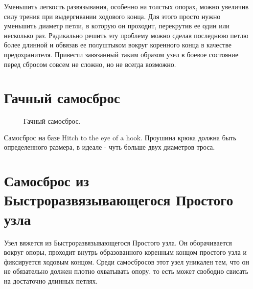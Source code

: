 \documentclass{artikel1}
\begin{document}
Уменьшить легкость развязывания, особенно на толстых опорах, можно увеличив силу трения при выдергивании ходового конца. Для этого просто нужно уменьшить диаметр петли, в которую он проходит, перекрутив ее один или несколько раз. Радикально решить эту проблему можно сделав последнюю петлю более длинной и обвязав ее полуштыком вокруг коренного конца в качестве предохранителя. Привести завязанный таким образом узел в боевое состояние перед сбросом совсем не сложно, но не всегда возможно.

\section{Гачный самосброс}

\begin{figure}[H]\centering
\setcounter{subfigure}{0}
	\begin{minipage}{1\linewidth}
		\begin{center}
			\tcbox[enhanced jigsaw,colframe=black,opacityframe=0.5,opacityback=0.5]
			{\centering{}}
		\end{center}
	\end{minipage}
\caption{Гачный самосброс.}
\label{ris:Gachny_samosbros}
\end{figure}

Самосброс на базе Hitch to the eye of a hook. Проушина крюка должна быть определенного размера, в идеале - чуть больше двух диаметров троса.

\section{Самосброс из Быстроразвязывающегося Простого узла}

Узел вяжется из Быстроразвязывающегося Простого узла. Он оборачивается вокруг опоры, проходит внутрь образованного коренным концом простого узла и фиксируется ходовым концом. Среди самосбросов этот узел уникален тем, что он не обязательно должен плотно охватывать опору, то есть может свободно свисать на достаточно длинных петлях.

\begin{figure}[H]\centering
	\subfloat[Завязывание]{\label{ris:Arbor_samosbros_1_1}
	\tcbox[enhanced jigsaw,colframe=black,opacityframe=0.5,opacityback=0.5,height=6.5cm]
		{\centering
			}
		}
\hfill
	\subfloat[Результат]{\label{ris:Arbor_samosbros_1_2}
	\tcbox[enhanced jigsaw,colframe=black,opacityframe=0.5,opacityback=0.5,height=6.5cm]
		{\centering
			}
		}
\end{figure}
\end{document}
